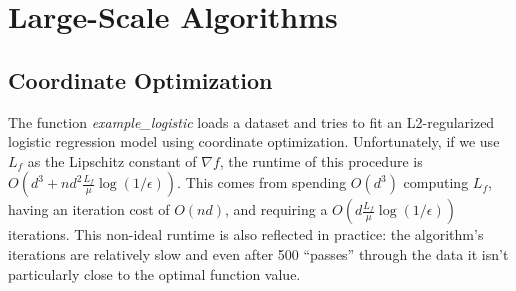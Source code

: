 \documentclass{article}
\begin{document}


\section{Large-Scale Algorithms}

\subsection{Coordinate Optimization}

The function \emph{example\_logistic} loads a dataset and tries to fit an L2-regularized logistic regression model using coordinate optimization. Unfortunately, if we use $L_f$ as the Lipschitz constant of $\nabla f$, the runtime of this procedure is $O(d^3 + nd^2\frac{L_f}{\mu}\log(1/\epsilon))$. This comes from spending $O(d^3)$ computing $L_f$, having an iteration cost of $O(nd)$, and requiring a $O(d\frac{L_f}{\mu}\log(1/\epsilon))$ iterations. This non-ideal runtime is also reflected in practice: the algorithm's iterations are relatively slow and even after 500 ``passes'' through the data it isn't particularly close to the optimal function value.
\end{document}
